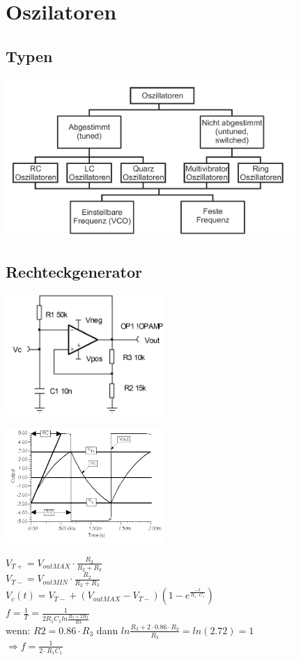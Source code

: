 \section{Oszilatoren}
\subsection{Typen}
	\begin{center}
		\includegraphics[width=11cm]{bilder/osziTypen.png}
	\end{center}
\subsection{Rechteckgenerator}
	\begin{multicols}{3}
		\includegraphics[width=6cm]{bilder/osziRechteck.png}
		\columnbreak
		
		\includegraphics[width=6cm]{bilder/osziRechteckSignal.png}
		\columnbreak
		
		$V_{T+}=V_{outMAX}\cdot\frac{R_2}{R_2+R_3}$\\
		$V_{T-}=V_{outMIN}\cdot\frac{R_2}{R_2+R_3}$\\
		$V_c(t)=V_{T-}+\left(V_{outMAX}-V_{T-}\right)\left(1-e^{\frac{-t}{R_1\cdot
		C_1}}\right)$\\
		$f=\frac{1}{T}=\frac{1}{2R_1C_1 ln \frac{R_3+2R_2}{R3}}$\\
		wenn: $R2 = 0.86 \cdot R_3$ dann $ln\frac{R_3 +2 \cdot 0.86 \cdot R_3}{R_3}=ln
		\left( 2.72 \right) = 1$\\
		$\Longrightarrow f=\frac{1}{2\cdot R_1C_1}$
	\end{multicols}

